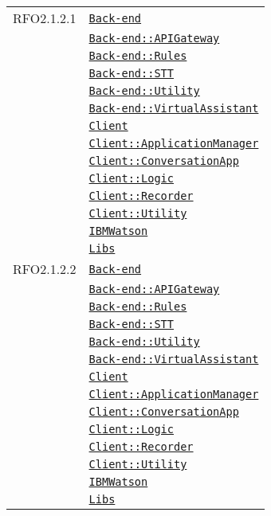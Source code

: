 \begin{longtable}{|>{\centering}m{3cm}|m{10cm}<{\centering}|}
RFO2.1.2.1 & \hyperref[Back-end]{\texttt{Back-end}}\\
& \hyperref[Back-end::APIGateway]{\texttt{Back-end::APIGateway}}\\
& \hyperref[Back-end::Rules]{\texttt{Back-end::Rules}}\\
& \hyperref[Back-end::STT]{\texttt{Back-end::STT}}\\
& \hyperref[Back-end::Utility]{\texttt{Back-end::Utility}}\\
& \hyperref[Back-end::VirtualAssistant]{\texttt{Back-end::VirtualAssistant}}\\
& \hyperref[Client]{\texttt{Client}}\\
& \hyperref[Client::ApplicationManager]{\texttt{Client::ApplicationManager}}\\
& \hyperref[Client::ConversationApp]{\texttt{Client::ConversationApp}}\\
& \hyperref[Client::Logic]{\texttt{Client::Logic}}\\
& \hyperref[Client::Recorder]{\texttt{Client::Recorder}}\\
& \hyperref[Client::Utility]{\texttt{Client::Utility}}\\
& \hyperref[IBMWatson]{\texttt{IBMWatson}}\\
& \hyperref[Libs]{\texttt{Libs}}\\ \hline

RFO2.1.2.2 & \hyperref[Back-end]{\texttt{Back-end}}\\
& \hyperref[Back-end::APIGateway]{\texttt{Back-end::APIGateway}}\\
& \hyperref[Back-end::Rules]{\texttt{Back-end::Rules}}\\
& \hyperref[Back-end::STT]{\texttt{Back-end::STT}}\\
& \hyperref[Back-end::Utility]{\texttt{Back-end::Utility}}\\
& \hyperref[Back-end::VirtualAssistant]{\texttt{Back-end::VirtualAssistant}}\\
& \hyperref[Client]{\texttt{Client}}\\
& \hyperref[Client::ApplicationManager]{\texttt{Client::ApplicationManager}}\\
& \hyperref[Client::ConversationApp]{\texttt{Client::ConversationApp}}\\
& \hyperref[Client::Logic]{\texttt{Client::Logic}}\\
& \hyperref[Client::Recorder]{\texttt{Client::Recorder}}\\
& \hyperref[Client::Utility]{\texttt{Client::Utility}}\\
& \hyperref[IBMWatson]{\texttt{IBMWatson}}\\
& \hyperref[Libs]{\texttt{Libs}}\\ \hline


\end{longtable}
